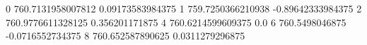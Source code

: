 0 760.7131958007812 0.09173583984375
1 759.7250366210938 -0.89642333984375
2 760.9776611328125 0.356201171875
4 760.6214599609375 0.0
6 760.5498046875 -0.0716552734375
8 760.652587890625 0.0311279296875
